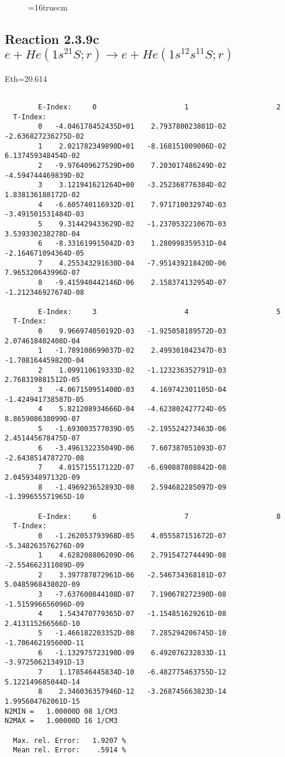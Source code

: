 \documentclass[12pt,dvipdfmx]{article}
\begin{document}
\begin{figure} \label{2.3.9b}
\epsfxsize=16truecm
\end{figure}
\newpage


\subsection{
Reaction 2.3.9c  $e + He(1s^21S;r) \rightarrow e + He(1s^12s^11S;r) $
}
Eth=20.614


\begin{small}\begin{verbatim}

        E-Index:     0                     1                     2
  T-Index:
        0   -4.046178452435D+01    2.793780023801D-02   -2.636827236275D-02
        1    2.021782349890D+01   -8.168151009006D-02    6.137459348454D-02
        2   -9.976409627529D+00    7.203017486249D-02   -4.594744469839D-02
        3    3.121941621264D+00   -3.252368776384D-02    1.838136188172D-02
        4   -6.605740116932D-01    7.971710032974D-03   -3.491501531484D-03
        5    9.314429433629D-02   -1.237053221067D-03    3.539330238278D-04
        6   -8.331619915042D-03    1.280998359531D-04   -2.164671094364D-05
        7    4.255343291630D-04   -7.951439218420D-06    7.965320643996D-07
        8   -9.415940442146D-06    2.158374132954D-07   -1.212346927674D-08

        E-Index:     3                     4                     5
  T-Index:
        0    9.966974050192D-03   -1.925058189572D-03    2.074618402408D-04
        1   -1.789108699037D-02    2.499301042347D-03   -1.708164459820D-04
        2    1.099110619333D-02   -1.123236352791D-03    2.768319881512D-05
        3   -4.067150951400D-03    4.169742301105D-04   -1.424941738587D-05
        4    5.821208934666D-04   -4.623802427724D-05    8.865908638099D-07
        5   -1.693003577039D-05   -2.195524273463D-06    2.451445678475D-07
        6   -3.496132235049D-06    7.607387051093D-07   -2.643851478727D-08
        7    4.015715517122D-07   -6.690887808842D-08    2.045934897132D-09
        8   -1.496923652893D-08    2.594682285097D-09   -1.399655571965D-10

        E-Index:     6                     7                     8
  T-Index:
        0   -1.262053793968D-05    4.055587151672D-07   -5.348263576276D-09
        1    4.628208806209D-06    2.791547274449D-08   -2.554662311089D-09
        2    3.397787872961D-06   -2.546734368181D-07    5.048596843802D-09
        3   -7.637600844108D-07    7.190678272390D-08   -1.515996656096D-09
        4    1.543470779365D-07   -1.154851629261D-08    2.413115266566D-10
        5   -1.466182203352D-08    7.285294206745D-10   -1.706462195600D-11
        6   -1.132975723190D-09    6.492076232833D-11   -3.972506213491D-13
        7    1.178546445834D-10   -6.482775463755D-12    5.122149685044D-14
        8    2.346036357946D-12   -3.268745663823D-14    1.995604762061D-15
N2MIN =   1.00000D 08 1/CM3
N2MAX =   1.00000D 16 1/CM3

  Max. rel. Error:   1.9207 %
  Mean rel. Error:    .5914 %



\end{verbatim}\end{small}
\end{document}
